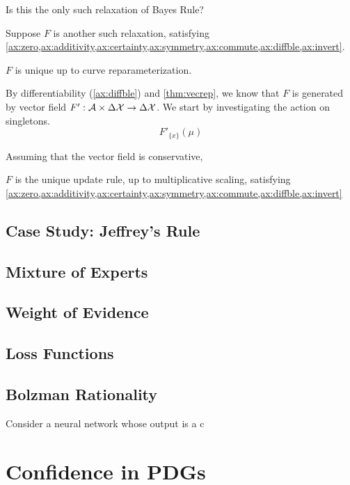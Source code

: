 \documentclass{article}
\begin{document}
\begin{wip}
Is this the only such relaxation of Bayes Rule?

Suppose $F$ is another such relaxation, satisfying \cref{ax:zero,ax:additivity,ax:certainty,ax:symmetry,ax:commute,ax:diffble,ax:invert}.

\begin{prop}
    $F$ is unique up to curve reparameterization.
\end{prop}

By differentiability (\cref{ax:diffble}) and \cref{thm:vecrep}, we know that $F$ is generated by vector field $F' : \mathcal A \times \Delta\mathcal X \to \Delta\mathcal X$.
We start by investigating the action on singletons.
\[
    F'_{\{x\}}(\mu)
\]

Assuming that the vector field is conservative,

\begin{conj}
    $F$ is the unique update rule, up to multiplicative scaling, satisfying
    \cref{ax:zero,ax:additivity,ax:certainty,ax:symmetry,ax:commute,ax:diffble,ax:invert}
\end{conj}
\end{wip}


\subsection{Case Study: Jeffrey's Rule}
\subsection{Mixture of Experts}

\subsection{Weight of Evidence}
\subsection{Loss Functions}
\subsection{Bolzman Rationality}

\begin{examplex}{}{}
    Consider a neural network whose output is a c
\end{examplex}

\section{Confidence in PDGs}
\end{document}
